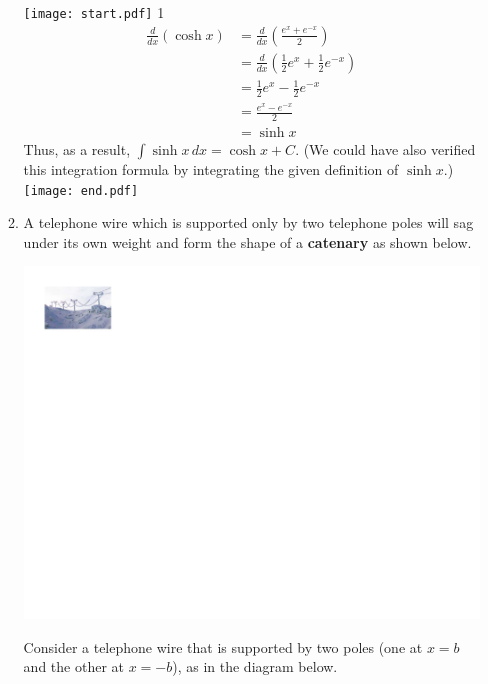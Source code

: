 \documentclass[12pt]{article}
\begin{document}
\begin{enumerate}
\begin{enumerate}
\texttt{[image: start.pdf]}
{{{1\linewidth}{
\begin{align*}
\frac{d}{dx}(\cosh{x}) &= \frac{d}{dx}\left(\frac{e^x+e^{-x}}{2}\right)\\
&=\frac{d}{dx}\left(\frac{1}{2}e^x+\frac{1}{2}e^{-x}\right)\\
&=\frac{1}{2}e^x-\frac{1}{2}e^{-x}\\
&=\frac{e^x-e^{-x}}{2}\\
&=\sinh{x}
\end{align*}
Thus, as a result, $\int \sinh{x}\,dx=\cosh{x}+C$.  (We could have also verified this integration formula by integrating the given definition of $\sinh{x}$.)
}}}
\texttt{[image: end.pdf]}


\item A telephone wire which is supported only by two telephone poles will sag under its own weight and form the shape of a {\bf catenary} as shown below.

\begin{center}
\includegraphics[scale=1]{catenary.pdf}
\end{center}

Consider a telephone wire that is supported by two poles (one at $x=b$ and the other at $x=-b$), as in the diagram below.


\end{enumerate}
\end{enumerate}
\end{document}

